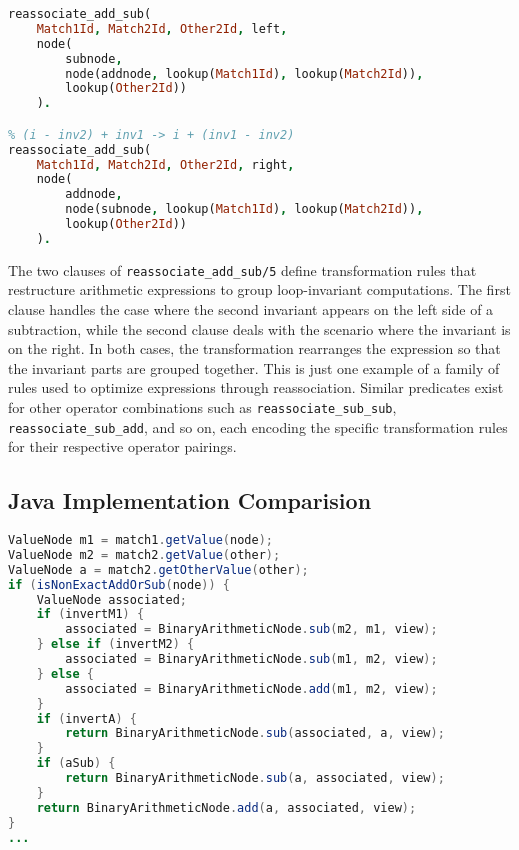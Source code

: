 \smallbreak
\begin{lstlisting}[language=Prolog]
% (inv2 - i) + inv1 -> (inv1 + inv2) - i
reassociate_add_sub(
    Match1Id, Match2Id, Other2Id, left,
    node(
        subnode, 
        node(addnode, lookup(Match1Id), lookup(Match2Id)), 
        lookup(Other2Id))
    ).

% (i - inv2) + inv1 -> i + (inv1 - inv2)
reassociate_add_sub(
    Match1Id, Match2Id, Other2Id, right,
    node(
        addnode, 
        node(subnode, lookup(Match1Id), lookup(Match2Id)), 
        lookup(Other2Id))
    ).
\end{lstlisting}

\smallbreak
The two clauses of \texttt{reassociate\_add\_sub/5} define transformation rules that restructure arithmetic expressions to group loop-invariant computations. The first clause handles the case where the second invariant appears on the left side of a subtraction, while the second clause deals with the scenario where the invariant is on the right. In both cases, the transformation rearranges the expression so that the invariant parts are grouped together. 
This is just one example of a family of rules used to optimize expressions through reassociation. Similar predicates exist for other operator combinations such as \texttt{reassociate\_sub\_sub}, \texttt{reassociate\_sub\_add}, and so on, each encoding the specific transformation rules for their respective operator pairings.

\subsection*{Java Implementation Comparision}

\begin{lstlisting}[language=Java]
ValueNode m1 = match1.getValue(node);
ValueNode m2 = match2.getValue(other);
ValueNode a = match2.getOtherValue(other);
if (isNonExactAddOrSub(node)) {
    ValueNode associated;
    if (invertM1) {
        associated = BinaryArithmeticNode.sub(m2, m1, view);
    } else if (invertM2) {
        associated = BinaryArithmeticNode.sub(m1, m2, view);
    } else {
        associated = BinaryArithmeticNode.add(m1, m2, view);
    }
    if (invertA) {
        return BinaryArithmeticNode.sub(associated, a, view);
    }
    if (aSub) {
        return BinaryArithmeticNode.sub(a, associated, view);
    }
    return BinaryArithmeticNode.add(a, associated, view);
}
...
\end{lstlisting}

